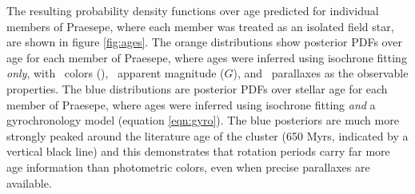 
The resulting probability density functions over age predicted for individual
members of Praesepe, where each member was treated as an isolated field star,
are shown in figure \ref{fig:ages}.
The orange distributions show posterior PDFs over age for each member of
Praesepe, where ages were inferred using isochrone fitting {\it only},
with \gaia\ colors (\gcolor), \gaia\ apparent magnitude ($G$), and \gaia\
parallaxes as the observable properties.
The blue distributions are posterior PDFs over stellar age for each member of
Praesepe, where ages were inferred using isochrone fitting {\it and}
a gyrochronology model (equation \ref{eqn:gyro}).
The blue posteriors are much more strongly peaked around the literature age of
the cluster (650 Myrs, indicated by a vertical black line) and this
demonstrates that rotation periods carry far more age information than
photometric colors, even when precise parallaxes are available.


